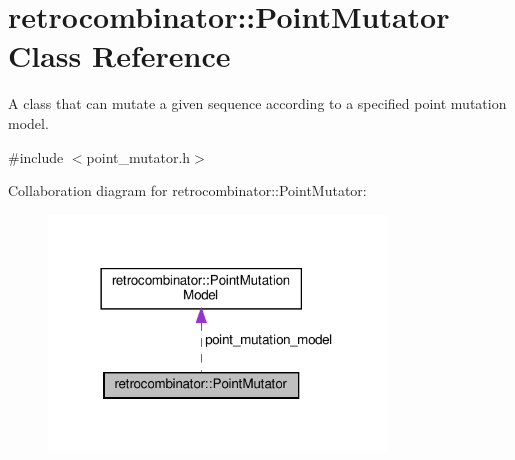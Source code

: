 \hypertarget{classretrocombinator_1_1PointMutator}{}\section{retrocombinator\+:\+:Point\+Mutator Class Reference}
\label{classretrocombinator_1_1PointMutator}


A class that can mutate a given sequence according to a specified point mutation model.  




{\ttfamily \#include $<$point\+\_\+mutator.\+h$>$}



Collaboration diagram for retrocombinator\+:\+:Point\+Mutator\+:
\nopagebreak
\begin{figure}[H]
\begin{center}
\leavevmode
\includegraphics[width=254pt]{classretrocombinator_1_1PointMutator__coll__graph}
\end{center}
\end{figure}
